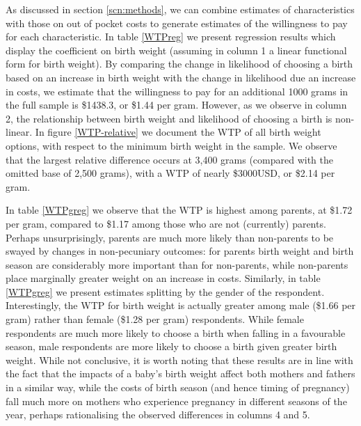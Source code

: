 \documentclass[a4paper, 11pt]{article}
\begin{document}
\begin{spacing}{1.4}
As discussed in section \ref{scn:methods}, we can combine estimates of
characteristics with those on out of pocket costs to generate estimates
of the willingness to pay for each characteristic.  In table \ref{WTPreg}
we present regression results which display the coefficient on birth weight
(assuming in column 1 a linear functional form for birth weight).  By comparing the change
in likelihood of choosing a birth based on an increase in birth weight
with the change in likelihood due an increase in costs, we estimate that
the willingness to pay for an additional 1000 grams in the full sample
is \$1438.3, or \$1.44 per gram.  However, as we observe in column 2,
the relationship between birth weight and likelihood of choosing a birth
is non-linear.  In figure \ref{WTP-relative} we document the WTP of all
birth weight options, with respect to the minimum birth weight in the
sample.  We observe that the largest relative difference occurs at 3,400
grams (compared with the omitted base of 2,500 grams), with a WTP of
nearly \$3000USD, or \$2.14 per gram.

In table \ref{WTPgreg} we observe that the WTP is highest among parents,
at \$1.72 per gram, compared to \$1.17 among those who are not (currently)
parents.  Perhaps unsurprisingly, parents are much more likely than
non-parents to be swayed by changes in non-pecuniary outcomes: for parents
birth weight and birth season are considerably more important than for
non-parents, while non-parents place marginally greater weight on an
increase in costs.  Similarly, in table \ref{WTPgreg} we present estimates
splitting by the gender of the respondent.  Interestingly, the WTP for
birth weight is actually greater among male (\$1.66 per gram) rather than
female (\$1.28 per gram) respondents.  While female respondents are much
more likely to choose a birth when falling in a favourable season, male
respondents are more likely to choose a birth given greater birth weight.
While not conclusive, it is worth noting that these results are in line with
the fact that the impacts of a baby's birth weight affect both mothers and
fathers in a similar way, while the costs of birth season (and hence timing
of pregnancy) fall much more on mothers who experience pregnancy in
different seasons of the year, perhaps rationalising the observed
differences in columns 4 and 5.


\end{spacing}
\end{document}
